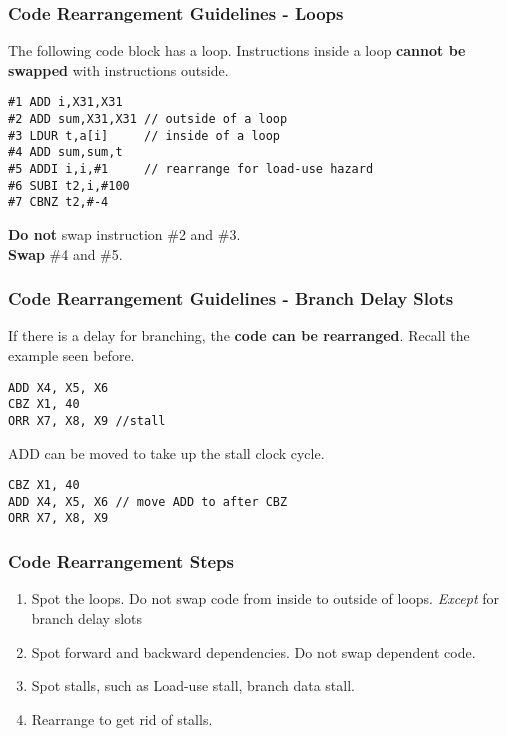 \begin{frame}[fragile]\frametitle{Code Rearrangement Guidelines - Loops}


The following code block has a loop. Instructions inside a loop \textbf{cannot be swapped} with instructions outside.
\begin{verbatim}
#1 ADD i,X31,X31
#2 ADD sum,X31,X31 // outside of a loop
#3 LDUR t,a[i]     // inside of a loop
#4 ADD sum,sum,t
#5 ADDI i,i,#1     // rearrange for load-use hazard
#6 SUBI t2,i,#100
#7 CBNZ t2,#-4
\end{verbatim}
\textbf{Do not} swap instruction \#2 and \#3.\\
\textbf{Swap} \#4 and \#5.
\end{frame}


\begin{frame}[fragile]\frametitle{Code Rearrangement Guidelines - Branch Delay Slots}

If there is a delay for branching, the\textbf{ code can be rearranged}. Recall the example seen before.
\begin{verbatim}
ADD X4, X5, X6
CBZ X1, 40
ORR X7, X8, X9 //stall
\end{verbatim}
ADD can be moved to take up the stall clock cycle.
\begin{verbatim}
CBZ X1, 40
ADD X4, X5, X6 // move ADD to after CBZ
ORR X7, X8, X9
\end{verbatim}
\end{frame}

\begin{frame}[fragile]\frametitle{Code Rearrangement Steps}
\begin{enumerate}

\item Spot the loops. Do not swap code from inside to outside of loops.
\textit{Except} for branch delay slots

\item Spot forward and backward dependencies. Do not swap dependent code.

\item Spot stalls, such as Load-use stall, branch data stall.

\item Rearrange to get rid of stalls.
\end{enumerate}
\end{frame}

